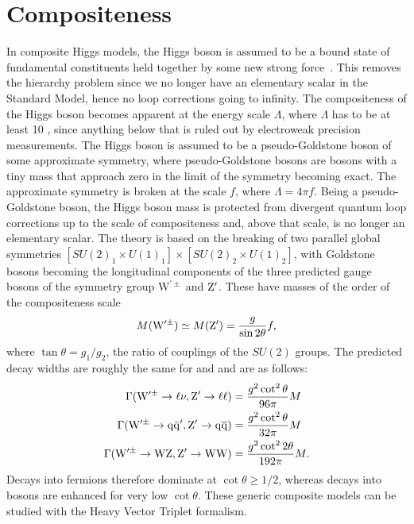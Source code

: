 \section{Compositeness}
In composite Higgs models, the Higgs boson is assumed to be a bound state of fundamental constituents held together by some new strong force~\cite{Bellazzini:2014yua,Contino:2011np}. This removes the hierarchy problem since we no longer have an elementary scalar in the Standard Model, hence no loop corrections going to infinity. The compositeness of the Higgs boson becomes apparent at the energy scale $\Lambda$, where $\Lambda$ has to be at least 10 \TeV, since anything below that is ruled out by electroweak precision measurements.
The Higgs boson is assumed to be a pseudo-Goldstone boson of some approximate symmetry, where pseudo-Goldstone bosons are bosons with a tiny mass that approach zero in the limit of the symmetry becoming exact. The approximate symmetry is broken at the scale $f$, where $\Lambda=4\pi f$. Being a pseudo-Goldstone boson, the Higgs boson mass is protected from divergent quantum loop corrections up to the scale of compositeness and, above that scale, is no longer an elementary scalar.
The theory is based on the breaking of two parallel global symmetries $[SU(2)_1 \times U(1)_1]\times[SU(2)_2 \times U(1)_2]$, with Goldstone bosons becoming the longitudinal components of the three predicted gauge bosons of the symmetry group $\mathrm{W}^{\prime\pm}$ and $\mathrm{Z}^\prime$. These have masses of the order of the compositeness scale
\begin{equation}\label{eqn:LHvprimeMass}
M(\mathrm{W}^{\prime\pm}) \simeq M(\mathrm{Z}^\prime) = \frac{g}{\sin2\theta}f,
\end{equation}
\noindent where $\tan\theta = g_1/g_2$, the ratio of couplings of the $SU(2)$ groups. The predicted decay widths are roughly the same for \PZpr and \PWpr and are as follows:
\begin{equation}
\begin{aligned}
\Gamma(\mathrm{W}^{\prime\pm} \to \ell\nu, \mathrm{Z}^\prime \to \ell\ell) & = \frac{g^2\cot^2\theta}{96\pi}M\\
\Gamma(\mathrm{W}^{\prime\pm} \to \mathrm{q}\bar{\mathrm{q}}^\prime,\mathrm{Z}^\prime \to \mathrm{q}\overline{\mathrm{q}}) & = \frac{g^2\cot^2\theta}{32\pi}M\\
\Gamma(\mathrm{W}^{\prime\pm} \to \mathrm{W}\mathrm{Z},\mathrm{Z}^\prime \to \mathrm{W}\mathrm{W}) & = \frac{g^2\cot^22\theta}{192\pi}M.
\end{aligned} 
\end{equation}
Decays into fermions therefore dominate at $\cot\theta \geq 1/2$, whereas decays into bosons are enhanced for very low $\cot\theta$. These generic composite models can be studied with the Heavy Vector Triplet formalism.

